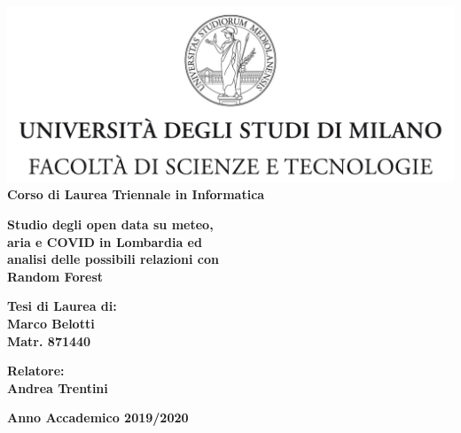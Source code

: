 \begin{titlepage}
\begin{center}
\includegraphics[width=\textwidth]{Logo.jpg}\\
{\large{\bf Corso di Laurea Triennale in Informatica}}
\end{center}
\vspace{12mm}
\begin{center}
{\huge{\bf Studio degli open data su meteo,}}\\
\vspace{4mm}
{\huge{\bf aria e COVID in Lombardia ed}}\\
\vspace{4mm}
{\huge{\bf analisi delle possibili relazioni con}}\\
\vspace{4mm}
{\huge{\bf Random Forest}}\\
\end{center}
\vspace{12mm}
\begin{flushright}
{\large{\bf Tesi di Laurea di:}}\\
{\large{\bf Marco Belotti}}\\
{\large{\bf Matr. 871440}}\\
\end{flushright}
\vspace{4mm}
\begin{flushleft}
{\large{\bf Relatore:}}\\
{\large{\bf Andrea Trentini}}\\
\vspace{4mm}
\end{flushleft}
\vspace{12mm}
\begin{center}
{\large{\bf Anno Accademico 2019/2020}}
\end{center}
\end{titlepage}

